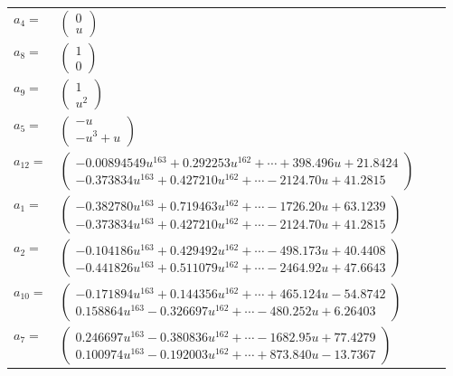 \documentclass[1p]{elsarticle_modified}
\theoremstyle{definition}
\begin{document}
\begin{tabular}{m{7pt} m{180pt} m{7pt} m{180pt} }
\flushright $a_{4}=$&$\begin{pmatrix}0\\u\end{pmatrix}$ \\
\flushright $a_{8}=$&$\begin{pmatrix}1\\0\end{pmatrix}$ \\
\flushright $a_{9}=$&$\begin{pmatrix}1\\u^2\end{pmatrix}$ \\
\flushright $a_{5}=$&$\begin{pmatrix}- u\\- u^3+u\end{pmatrix}$ \\
\flushright $a_{12}=$&$\begin{pmatrix}-0.00894549 u^{163}+0.292253 u^{162}+\cdots+398.496 u+21.8424\\-0.373834 u^{163}+0.427210 u^{162}+\cdots-2124.70 u+41.2815\end{pmatrix}$ \\
\flushright $a_{1}=$&$\begin{pmatrix}-0.382780 u^{163}+0.719463 u^{162}+\cdots-1726.20 u+63.1239\\-0.373834 u^{163}+0.427210 u^{162}+\cdots-2124.70 u+41.2815\end{pmatrix}$ \\
\flushright $a_{2}=$&$\begin{pmatrix}-0.104186 u^{163}+0.429492 u^{162}+\cdots-498.173 u+40.4408\\-0.441826 u^{163}+0.511079 u^{162}+\cdots-2464.92 u+47.6643\end{pmatrix}$ \\
\flushright $a_{10}=$&$\begin{pmatrix}-0.171894 u^{163}+0.144356 u^{162}+\cdots+465.124 u-54.8742\\0.158864 u^{163}-0.326697 u^{162}+\cdots-480.252 u+6.26403\end{pmatrix}$ \\
\flushright $a_{7}=$&$\begin{pmatrix}0.246697 u^{163}-0.380836 u^{162}+\cdots-1682.95 u+77.4279\\0.100974 u^{163}-0.192003 u^{162}+\cdots+873.840 u-13.7367\end{pmatrix}$ \\

\end{tabular}
\end{document}

